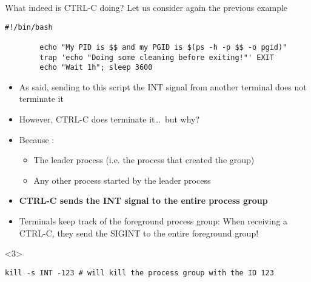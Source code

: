 \begin{frame}[fragile]{What indeed is CTRL-C doing?}
    \vspace{-3mm}
    Let us consider again the previous example
    \begin{lstlisting}[style=MyBash, numbers=none, aboveskip=2mm]
        #!/bin/bash

        echo "My PID is $$ and my PGID is $(ps -h -p $$ -o pgid)"
        trap 'echo "Doing some cleaning before exiting!"' EXIT
        echo "Wait 1h"; sleep 3600
    \end{lstlisting}
    \begin{overlayarea}{\textwidth}{0.5\textheight}
        \begin{itemize}
            \item<1-> As said, sending to this script the INT signal from another terminal does not terminate it
            \item<1-> However, CTRL-C does terminate it\ldots\ but why?
            \item<2-> Because :
                      \begin{itemize}
                          \item The leader process (i.e. the process that created the group)
                          \item Any other process started by the leader process
                      \end{itemize}
            \item<2-> \alert{\textbf{CTRL-C sends the INT signal to the entire process group}}
            \item<2-> Terminals keep track of the foreground process group: When receiving a CTRL-C, they send the SIGINT to the entire foreground group!
        \end{itemize}
        \begin{onlyenv}<3>
            \begin{lstlisting}[style=MyBash, numbers=none, xleftmargin=2mm, xrightmargin=2mm]
                kill -s INT -123 # will kill the process group with the ID 123
            \end{lstlisting}
        \end{onlyenv}
    \end{overlayarea}
\end{frame}
